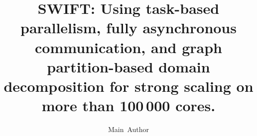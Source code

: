 \documentclass{sig-alternate-05-2015}
\begin{document}

\title{{\ttlit SWIFT}: Using task-based parallelism, fully asynchronous
communication, and graph partition-based domain decomposition for
strong scaling on more than 100\,000 cores.}

  
\author{
\alignauthor
       Main~Author\\
       \\
       \\
       \\
       \\
}
\end{document}
